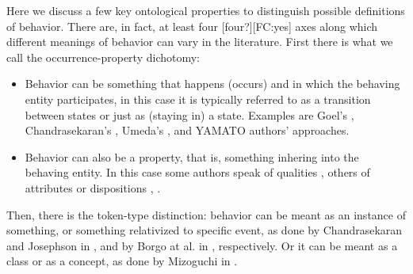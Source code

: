 \documentclass[sw]{iosart2x}
\newcommand{\YAMATO}{\textsc{YAMATO}\xspace}
\newcommand{\stateVarCond}[1]{%
  \ifthenelse{\equal{#1}{fullSingular}}{system condition}{%
    \ifthenelse{\equal{#1}{shortSingular}}{condition}{%
      \ifthenelse{\equal{#1}{fullPlural}}{system conditions}{%
        \ifthenelse{\equal{#1}{shortPlural}}{conditions}{%
          ERROR!%
        }%
      }%
    }%
  }%
}
\newcommand{\TODO}[1]{{\color{red} #1}}
\begin{document}

{%
Here we discuss a few key ontological properties to distinguish possible definitions of behavior.
There are, in fact, at least four \TODO{[four?][FC:yes]} axes along which different meanings of behavior can vary in the literature.
First there is what we call the occurrence-property dichotomy:
\begin{itemize}
  \item Behavior can be something that happens (occurs) and in which the behaving entity participates, 
  in this case it is typically referred to as a transition between states or just as (staying in) a state. 
  Examples are Goel's \cite{goelStructureBehaviorFunction2009}, Chandrasekaran's \cite{chandrasekaranFunctionDeviceRepresentation2000}, Umeda's \cite{umedaFunctionBehaviourStructure1990}, and \YAMATO authors' \cite{mizoguchiFunctionalOntologyArtifacts2009} approaches.
  \item Behavior can also be a property, that is, something inhering into the behaving entity. 
  In this case some authors speak of qualities \cite{borgoFormalOntologicalPerspective2009}, others of attributes or dispositions \cite{vermaasConceptualFrameworkJohn2007}, \cite{geroCategorisingTechnologicalKnowledge2002}.
\end{itemize} 

Then, there is the token-type distinction: behavior %
can be meant as an instance of something, or something relativized to specific event, as done by Chandrasekaran and Josephson in \cite{chandrasekaranFunctionDeviceRepresentation2000}, and by Borgo at al. in \cite{borgoFormalOntologicalPerspective2009}, respectively. Or it can be meant as a class or as a concept, as done by Mizoguchi in \cite{mizoguchiFunctionalOntologyArtifacts2009}.

}
\end{document}
